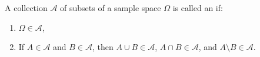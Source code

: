 A collection $\mathcal{A}$ of subsets of a sample space $\Omega$ is called an  if:
\begin{enumerate}
\item $\Omega \in \mathcal{A}$,
\item If $A \in \mathcal{A}$ and $B \in \mathcal{A}$, then $A \cup B \in \mathcal{A}$, $A \cap B \in \mathcal{A}$, and $A \setminus B \in \mathcal{A}$.
\end{enumerate}
